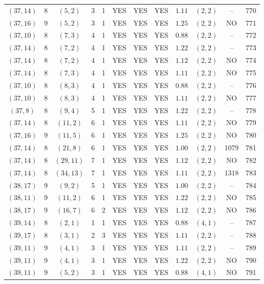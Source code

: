 \begin{longtable}{|c|c|c|c|c|c|c|c|c|c|c|c|}
$(37,14)$ & 8 & $(5,2)$ & 3 & 1 & YES & YES & YES & $1.11$ & $(2,2)$ & -- & 770\\
$(37,16)$ & 9 & $(5,2)$ & 3 & 1 & YES & YES & YES & $1.25$ & $(2,2)$ & NO & 771\\
$(37,10)$ & 8 & $(7,3)$ & 4 & 1 & YES & YES & YES & $0.88$ & $(2,2)$ & -- & 772\\
$(37,14)$ & 8 & $(7,2)$ & 4 & 1 & YES & YES & YES & $1.22$ & $(2,2)$ & -- & 773\\
$(37,14)$ & 8 & $(7,2)$ & 4 & 1 & YES & YES & YES & $1.12$ & $(2,2)$ & NO & 774\\
$(37,14)$ & 8 & $(7,3)$ & 4 & 1 & YES & YES & YES & $1.11$ & $(2,2)$ & NO & 775\\
$(37,10)$ & 8 & $(8,3)$ & 4 & 1 & YES & YES & YES & $0.88$ & $(2,2)$ & -- & 776\\
$(37,10)$ & 8 & $(8,3)$ & 4 & 1 & YES & YES & YES & $1.11$ & $(2,2)$ & NO & 777\\
$(37,8)$ & 8 & $(9,4)$ & 5 & 1 & YES & YES & YES & $1.22$ & $(2,2)$ & -- & 778\\
$(37,14)$ & 8 & $(11,2)$ & 6 & 1 & YES & YES & YES & $1.11$ & $(2,2)$ & NO & 779\\
$(37,16)$ & 9 & $(11,5)$ & 6 & 1 & YES & YES & YES & $1.25$ & $(2,2)$ & NO & 780\\
$(37,14)$ & 8 & $(21,8)$ & 6 & 1 & YES & YES & YES & $1.00$ & $(2,2)$ & 1079 & 781\\
$(37,14)$ & 8 & $(29,11)$ & 7 & 1 & YES & YES & YES & $1.12$ & $(2,2)$ & NO & 782\\
$(37,14)$ & 8 & $(34,13)$ & 7 & 1 & YES & YES & YES & $1.11$ & $(2,2)$ & 1318 & 783\\
$(38,17)$ & 9 & $(9,2)$ & 5 & 1 & YES & YES & YES & $1.00$ & $(2,2)$ & -- & 784\\
$(38,11)$ & 9 & $(11,2)$ & 6 & 1 & YES & YES & YES & $1.22$ & $(2,2)$ & NO & 785\\
$(38,17)$ & 9 & $(16,7)$ & 6 & 2 & YES & YES & YES & $1.12$ & $(2,2)$ & NO & 786\\
$(39,14)$ & 8 & $(2,1)$ & 1 & 1 & YES & YES & YES & $0.88$ & $(4,1)$ & -- & 787\\
$(39,17)$ & 8 & $(3,1)$ & 2 & 3 & YES & YES & YES & $1.11$ & $(2,2)$ & -- & 788\\
$(39,11)$ & 9 & $(4,1)$ & 3 & 1 & YES & YES & YES & $1.11$ & $(2,2)$ & -- & 789\\
$(39,11)$ & 9 & $(4,1)$ & 3 & 1 & YES & YES & YES & $1.22$ & $(2,2)$ & NO & 790\\
$(39,11)$ & 9 & $(5,2)$ & 3 & 1 & YES & YES & YES & $0.88$ & $(4,1)$ & NO & 791\\

\end{longtable}
